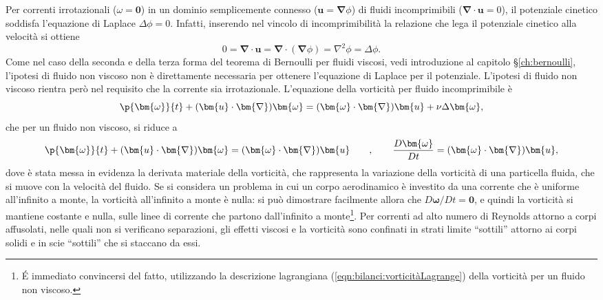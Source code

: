 Per correnti irrotazionali ($\omega = \bm{0}$) in un dominio semplicemente connesso ($\bm{u} = \bm{\nabla} \phi$) di fluidi incomprimibili ($\bm{\nabla} \cdot \bm{u} = 0$), il potenziale cinetico soddisfa l'equazione di Laplace $\Delta \phi = 0$. Infatti, inserendo nel vincolo di incomprimibilità la relazione che lega il potenziale cinetico alla velocità si ottiene
\begin{equation}
 0 = \bm{\nabla} \cdot \bm{u} = \bm{\nabla} \cdot (\bm{\nabla} \phi) = \nabla^2 \phi = \Delta \phi .
\end{equation}
Come nel caso della seconda e della terza forma del teorema di Bernoulli per fluidi viscosi, vedi introduzione al capitolo \S\ref{ch:bernoulli}, l'ipotesi di fluido non viscoso non è direttamente necessaria per ottenere l'equazione di Laplace per il potenziale. L'ipotesi di fluido non viscoso rientra però nel requisito che la corrente sia irrotazionale. L'equazione della vorticità per fluido incomprimibile è
\begin{equation}
 \p{\bm{\omega}}{t} + (\bm{u} \cdot \bm{\nabla}) \bm{\omega} = (\bm{\omega} \cdot \bm{\nabla}) \bm{u} + \nu \Delta \bm{\omega} ,
\end{equation}
che per un fluido non viscoso, si riduce a 
\begin{equation}
 \p{\bm{\omega}}{t} + (\bm{u} \cdot \bm{\nabla}) \bm{\omega} = (\bm{\omega} \cdot \bm{\nabla}) \bm{u}  \qquad , \qquad
 \dfrac{D \bm{\omega}}{D t} = (\bm{\omega} \cdot \bm{\nabla}) \bm{u} ,
\end{equation}
dove è stata messa in evidenza la derivata materiale della vorticità, che rappresenta la variazione della vorticità di una particella fluida, che si muove con la velocità del fluido. Se si considera un problema in cui un corpo aerodinamico è investito da una corrente che è uniforme all'infinito a monte, la vorticità all'infinito a monte è nulla: si può dimostrare facilmente allora che $D\bm{\omega} / D t = \bm{0}$, e quindi la vorticità si mantiene costante e nulla, sulle linee di corrente che partono dall'infinito a monte\footnote{\'E immediato convincersi del fatto, utilizzando la descrizione lagrangiana (\ref{eqn:bilanci:vorticitàLagrange}) della vorticità per un fluido non viscoso.}. Per correnti ad alto numero di Reynolds attorno a corpi affusolati, nelle quali non si verificano separazioni, gli effetti viscosi e la vorticità sono confinati in strati limite ``sottili'' attorno ai corpi solidi e in scie ``sottili'' che si staccano da essi. 

